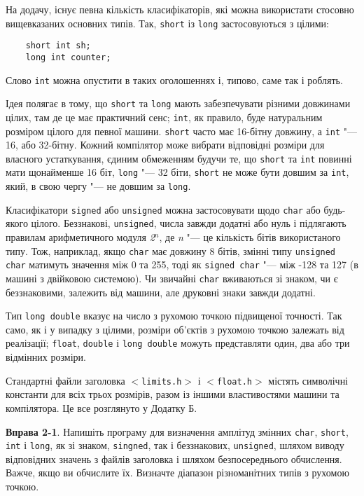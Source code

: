 \documentclass[a4paper,12pt]{book}
\begin{document}
  На додачу, існує певна кількість класифікаторів, які можна використати стосовно
  вищевказаних основних типів. Так, \texttt{short} із \texttt{long} застосовуються з
  цілими:
  \begin{verbatim}
    short int sh;
    long int counter;
  \end{verbatim}

  Слово \texttt{int} можна опустити в таких оголошеннях і, типово, саме так і роблять.

  Ідея полягає в тому, що \texttt{short} та \texttt{long} мають забезпечувати різними
  довжинами цілих, там де це має практичний сенс; \texttt{int}, як правило, буде
  натуральним розміром цілого для певної машини. \texttt{short} часто має 16-бітну
  довжину, а \texttt{int} "--- 16, або 32-бітну. Кожний компілятор може вибрати
  відповідні розміри для власного устаткування, єдиним обмеженням будучи те, що
  \texttt{short} та \texttt{int} повинні мати щонайменше 16 біт, \texttt{long} "--- 32
  біти, \texttt{short} не може бути довшим за \texttt{int}, який, в свою чергу "--- не
  довшим за \texttt{long}.

  Класифікатори \texttt{signed} або \texttt{unsigned} можна застосовувати щодо
  \texttt{char} або будь-якого цілого. Беззнакові, \texttt{unsigned}, числа завжди додатні
  або нуль і підлягають правилам арифметичного модуля \textit{2\(^{n}\)}, де \textit{n}
  "--- це кількість бітів використаного типу. Тож, наприклад, якщо \texttt{char} має
  довжину 8 бітів, змінні типу \texttt{unsigned char} матимуть значення між 0 та 255, тоді
  як \texttt{signed char} "--- між -128 та 127 (в машині з двійковою системою). Чи
  звичайні \texttt{char} вживаються зі знаком, чи є беззнаковими, залежить від машини, але
  друковні знаки завжди додатні.

  Тип \texttt{long double} вказує на число з рухомою точкою підвищеної точності. Так само,
  як і у випадку з цілими, розміри об'єктів з рухомою точкою залежать від реалізації;
  \texttt{float}, \texttt{double} і \texttt{long double} можуть представляти один, два або
  три відмінних розміри.

  Стандартні файли заголовка \texttt{\mbox{$<$}limits.h\mbox{$>$}} і \texttt{\mbox{$<$}float.h\mbox{$>$}} містять
  символічні константи для всіх трьох розмірів, разом із іншими властивостями машини та
  компілятора. Це все розглянуто у Додатку Б.

  \textbf{Вправа 2-1}. Напишіть програму для визначення амплітуд змінних \texttt{char},
  \texttt{short}, \texttt{int} і \texttt{long}, як зі знаком, \texttt{singned}, так і
  беззнакових, \texttt{unsigned}, шляхом виводу відповідних значень з файлів заголовка і
  шляхом безпосереднього обчислення. Важче, якщо ви обчислите їх. Визначте діапазон
  різноманітних типів з рухомою точкою.
\end{document}
